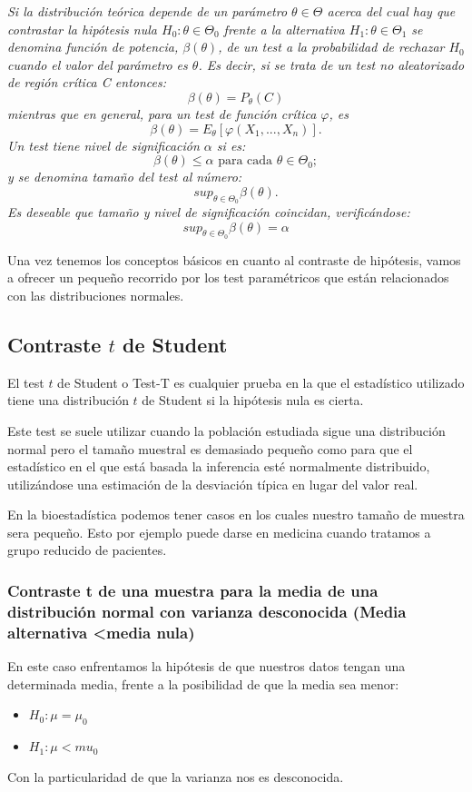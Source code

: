 \documentclass[a4paper,12pt]{article}
\begin{document}
\textit{ Si la distribución teórica depende de un parámetro $\theta \in \Theta$ acerca del cual hay que contrastar la hipótesis nula $H_0: \theta \in \Theta_0$ frente a la alternativa $H_1: \theta \in \Theta_1$ se denomina función de potencia, $\beta(\theta)$, de un test a la probabilidad de rechazar $H_0$ cuando el valor del parámetro es $\theta$. Es decir, si se trata de un test no aleatorizado de región crítica C entonces: $$\beta(\theta)=P_\theta(C)$$
mientras que en general, para un test de función crítica $\varphi$, es $$\beta(\theta)=E_\theta[\varphi(X_1,...,X_n)].$$
Un test tiene nivel de significación $\alpha$ si es:  $$\beta(\theta)\leq\alpha \text{ para cada } \theta \in \Theta_0;$$
y se denomina tamaño del test al número: $$sup_{\theta\in\Theta_0}\beta(\theta).$$
Es deseable que tamaño y nivel de significación coincidan, verificándose: 
$$sup_{\theta\in\Theta_0}\beta(\theta)=\alpha$$ }

Una vez tenemos los conceptos básicos en cuanto al contraste de hipótesis, vamos a ofrecer un pequeño recorrido por los test paramétricos que están relacionados con las distribuciones normales.


 \subsection{Contraste $t$ de Student}
 El test $t$ de Student o Test-T es cualquier prueba en la que el estadístico utilizado tiene una distribución $t$ de Student si la hipótesis nula es cierta.
 
 Este test se suele utilizar cuando la población estudiada sigue una distribución normal pero el tamaño muestral es demasiado pequeño como para que el estadístico en el que está basada la inferencia esté normalmente distribuido, utilizándose una estimación de la desviación típica en lugar del valor real. 
 
 En la bioestadística podemos tener casos en los cuales nuestro tamaño de muestra sera pequeño. Esto por ejemplo puede darse en medicina cuando tratamos a grupo reducido de pacientes.

 \subsubsection{Contraste t de una muestra para la media de una distribución normal con varianza desconocida (Media alternativa <media nula)  }
 
 En este caso enfrentamos la hipótesis de que nuestros datos tengan una determinada media, frente a la posibilidad  de que la media sea menor: 
 \begin{itemize}
 	\item $H_0:\mu=\mu_0$
 	\item $H_1: \mu<mu_0$
 \end{itemize}
 Con la particularidad de que la varianza nos es desconocida.
 
\end{document}

